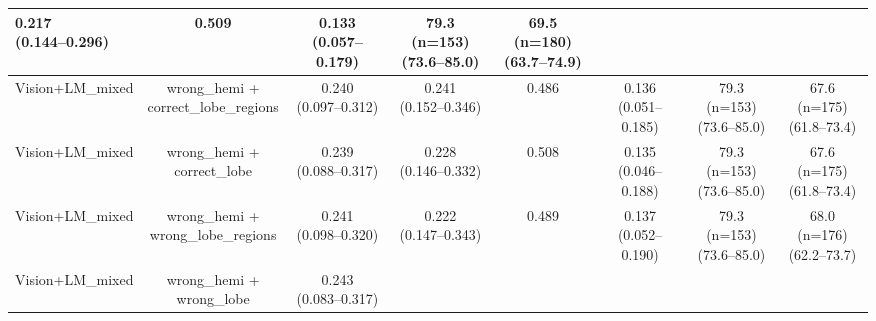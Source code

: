 \documentclass[FCD_GNN.tex]{subfiles}
\begin{document}
\begin{table}[H]
\begin{tabular}{lccccccc}
\makecell{0.217 \\ (0.144--0.296)} &
\colorbox{cyan!15}{0.509} &
\makecell{0.133 \\ (0.057--0.179)} &
\makecell{79.3 (n=153) \\ (73.6--85.0)} &
\makecell{\colorbox{cyan!15}{69.5 (n=180)} \\ (63.7--74.9)} \\
\hline
Vision+LM\_mixed & 
\makecell{wrong\_hemi + \\ correct\_lobe\_regions} &
\makecell{0.240 \\ (0.097--0.312)} &
\makecell{\colorbox{green!15}{0.241} \\ (0.152--0.346)} &
0.486 &
\makecell{0.136 \\ (0.051--0.185)} &
\makecell{79.3 (n=153) \\ (73.6--85.0)} &
\makecell{67.6 (n=175) \\ (61.8--73.4)} \\
\hline
Vision+LM\_mixed & 
\makecell{wrong\_hemi + \\ correct\_lobe} &
\makecell{0.239 \\ (0.088--0.317)} &
\makecell{\colorbox{orange!15}{0.228} \\ (0.146--0.332)} &
\colorbox{orange!15}{0.508} &
\makecell{0.135 \\ (0.046--0.188)} &
\makecell{79.3 (n=153) \\ (73.6--85.0)} &
\makecell{67.6 (n=175) \\ (61.8--73.4)} \\
\hline
Vision+LM\_mixed & \makecell{wrong\_hemi + \\ wrong\_lobe\_regions} &
\makecell{0.241 \\ (0.098--0.320)} &
\makecell{0.222 \\ (0.147--0.343)} &
0.489 &
\makecell{0.137 \\ (0.052--0.190)} &
\makecell{79.3 (n=153) \\ (73.6--85.0)} &
\makecell{68.0 (n=176) \\ (62.2--73.7)} \\
\hline
Vision+LM\_mixed & \makecell{wrong\_hemi + \\ wrong\_lobe} &
\makecell{\colorbox{orange!15}{0.243} \\ (0.083--0.317)} &

\end{tabular}
\end{table}
\end{document}
